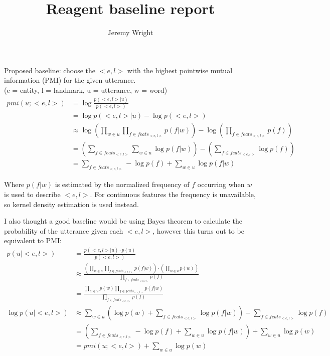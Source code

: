 \documentclass[12pt]{article}
\title{Reagent baseline report}
\author{Jeremy Wright}
\begin{document}
\maketitle

\noindent 
Proposed baseline: choose the $<e,l>$ with the highest pointwise mutual information (PMI) for the given utterance.\\
 (e = entity, l = landmark, u = utterance,
w = word)
\begin{align*}
pmi(u;<e,l>) & = \log \frac{p(<e,l>|u)}{p(<e,l>)}\\
             & = \log{p(<e,l>|u)}-\log{p(<e,l>)}\\
             & \approx \log{\left(\prod_{w\in u} \prod_{f \in feats_{<e,l>}} p(f|w)\right)} - \log{\left(\prod_{f \in feats_{<e,l>}} p(f)\right)}\\
             & = \left(\sum_{f \in feats_{<e,l>}}\sum_{w\in u} \log{p(f|w)}\right) - \left(\sum_{f \in feats_{<e,l>}}\log{p(f)}\right)\\
             & = \sum_{f \in feats_{<e,l>}} -\log{p(f)} + \sum_{w\in u}\log{p(f|w)} 
\end{align*}

Where $p(f|w)$ is estimated by the normalized frequency of $f$ occurring when $w$ is used to describe $<e,l>$. For continuous features the frequency is unavailable, so kernel density estimation is used instead. 

I also thought a good baseline would be using Bayes theorem to calculate the probability of the utterance given each $<e,l>$, however this turns out to be equivalent to PMI:
\begin{align*}
p(u|<e,l>) & = \frac{p(<e,l>|u)\cdot p(u)}{p(<e,l>)}\\
           & \approx \frac{\left(\prod_{w\in u} \prod_{f \in feats_{<e,l>}} p(f|w)\right)\cdot\left(\prod_{w\in u} p(w)\right)}{\prod_{f \in feats_{<e,l>}} p(f)}\\
           & = \frac{\prod_{w\in u} p(w) \prod_{f \in feats_{<e,l>}} p(f|w)}{\prod_{f \in feats_{<e,l>}} p(f)}\\
\log{p(u|<e,l>)} & \approx \sum_{w\in u}\left(\log{p(w)} + \sum_{f \in feats_{<e,l>}}\log{p(f|w)}\right)-\sum_{f \in feats_{<e,l>}}\log{p(f)}\\
           & = \left(\sum_{f \in feats_{<e,l>}} -\log{p(f)} + \sum_{w\in u}\log{p(f|w)}\right) +  \sum_{w\in u}\log{p(w)}\\
           & = pmi(u;<e,l>) + \sum_{w\in u}\log{p(w)}
\end{align*}
\end{document}
